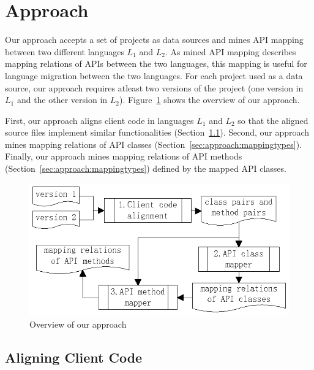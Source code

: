 \section{Approach}
\label{sec:approach}

Our approach accepts a set of projects as data sources and mines
API mapping between two different languages $L_1$ and $L_2$. 
As mined API mapping describes mapping relations of APIs between 
the two languages, this mapping is useful for language migration between the two languages. 
For each project used as a data source, our approach requires 
atleast two versions of the project (one version in $L_1$ and
the other version in $L_2$). Figure~\ref{fig:approach} shows
the overview of our approach.

First, our approach aligns client code in languages $L_1$ and $L_2$ 
so that the aligned source files implement similar functionalities 
(Section~\ref{sec:approach:acc}). Second, our approach mines 
mapping relations of API classes (Section~\ref{sec:approach:mappingtypes}). 
Finally, our approach mines mapping relations of API 
methods (Section~\ref{sec:approach:mappingtypes}) defined by the mapped
API classes.

\begin{figure}[t]
\centering
\includegraphics[scale=1,clip]{figure/approach.eps}\vspace*{-3ex}
 \caption{Overview of our approach}\vspace*{-3.5ex}
 \label{fig:approach}
\end{figure}

\subsection{Aligning Client Code}
\label{sec:approach:acc}

